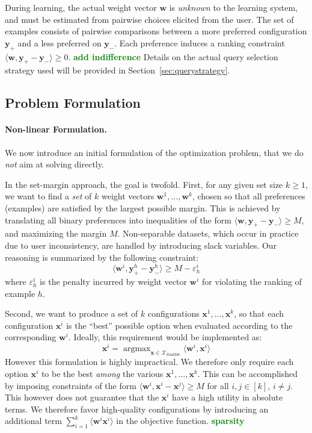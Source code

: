 \documentclass{article}
\renewcommand\[{\begin{equation}}
\renewcommand\]{\end{equation}}
\newcommand{\calvar}[1]{\ensuremath{\mathcal{#1}}}
\newcommand{\calX}{\calvar{X}}
\newcommand{\vecvar}[1]{\ensuremath{\boldsymbol{#1}}}
\newcommand{\vw}{\vecvar{w}}
\newcommand{\vx}{\vecvar{x}}
\newcommand{\vy}{\vecvar{y}}
\DeclareMathOperator*{\argmax}{argmax}
\newcommand{\stefano}[1]{{\bf \textcolor{green}{{\fbox{Stefano:} #1}}}}
\begin{document}
During learning, the actual weight vector $\vw$ is {\em unknown} to the
learning system, and must be estimated from pairwise choices elicited from the
user. The set of examples consists of pairwise comparisons between a more
preferred configuration $\vy_+$ and a less preferred on $\vy_-$. Each preference
induces a ranking constraint $\langle \vw, \vy_+ - \vy_- \rangle \ge 0$.
\stefano{add indifference}
Details on the actual query selection strategy used will be provided in
Section~\ref{sec:querystrategy}.

\subsection{Problem Formulation}

\paragraph{Non-linear Formulation.} We now introduce an initial formulation of
the optimization problem, that we do {\em not} aim at solving directly.

In the set-margin approach, the goal is twofold. First, for any given set size
$k\geq 1$, we want to find a {\em set} of $k$ weight vectors $\vw^{1},
\ldots, \vw^{k}$, chosen so that all preferences (examples) are satisfied by
the largest possible margin. This is achieved by translating all binary
preferences into inequalities of the form $\langle \vw, \vy_+ - \vy_- \rangle
\geq M$, and maximizing the margin $M$. Non-separable datasets, which occur in
practice due to user inconsistency, are handled by introducing slack variables.
Our reasoning is summarized by the following constraint:
%
$$ \langle \vw^{i}, \vy^{h}_+ - \vy^{h}_- \rangle \ge M - \varepsilon^{i}_h $$
%
where $\varepsilon^{i}_h$ is the penalty incurred by weight vector
$\vw^{i}$ for violating the ranking of example $h$.

Second, we want to produce a set of $k$ configurations $\vx^{1}, \ldots,
\vx^{k}$, so that each configuration $\vx^{i}$ is the ``best'' possible
option when evaluated according to the corresponding $\vw^{i}$. Ideally,
this requirement would be implemented as:
%
$$ \vx^{i} = \argmax_{\vx \in \calX_\text{feasible}} \langle \vw^{i}, \vx^{i} \rangle $$
%
However this formulation is highly impractical. We therefore only require 
each option $\vx^{i}$ to be the best {\em among} the various
$\vx^{1}, \ldots, \vx^{k}$. This can be accomplished by imposing
constraints of the form $\langle \vw^{i}, \vx^{i} - \vx^{j} \rangle \geq M$
for all $i,j\in[k]$, $i \ne j$.
This however does not guarantee that the $\vx^{i}$ have a high utility in
absolute terms. We therefore favor high-quality configurations by introducing
an additional term $\sum_{i=1}^k \langle \vw^{i} \vx^{i} \rangle$ in the
objective function. \stefano{sparsity}
\end{document}
